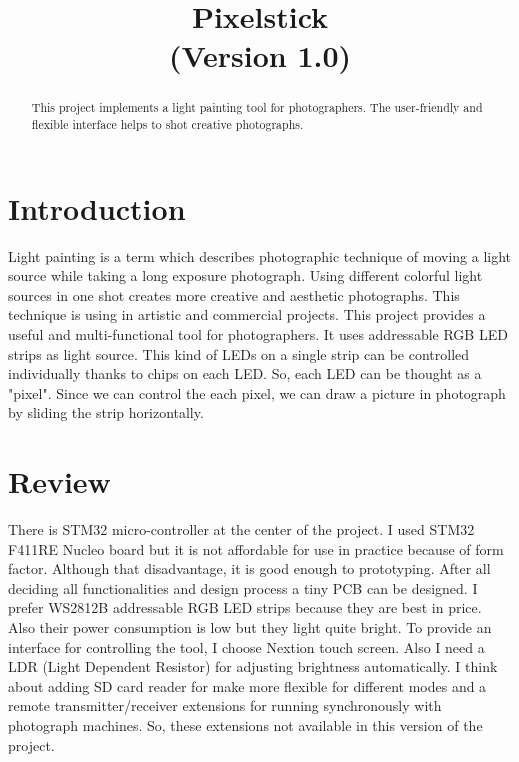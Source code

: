 \documentclass[conference]{IEEEtran}
\begin{document}
\title{Pixelstick\\(Version 1.0)\\
{\footnotesize}
}

\author{
}

\maketitle

\begin{abstract}
This project implements a light painting tool for photographers. The user-friendly and flexible interface helps to shot creative photographs.
\end{abstract}

\section{Introduction}
Light painting is a term which describes photographic technique of moving a light source while taking a long exposure photograph. Using different colorful light sources in one shot creates more creative and aesthetic photographs. This technique is using in artistic and commercial projects. This project provides a useful and multi-functional tool for photographers. It uses addressable RGB LED strips as light source. This kind of LEDs on a single strip can be controlled individually thanks to chips on each LED. So, each LED can be thought as a "pixel". Since we can control the each pixel, we can draw a picture in photograph by sliding the strip horizontally. \\


\section{Review}
There is STM32 micro-controller at the center of the project. I used STM32 F411RE Nucleo board but it is not affordable for use in practice because of form factor. Although that disadvantage, it is good enough to prototyping. After all deciding all functionalities and design process a tiny PCB can be designed. I prefer WS2812B addressable RGB LED strips because they are best in price. Also their power consumption is low but they light quite bright. To provide an interface for controlling the tool, I choose Nextion touch screen. Also I need a LDR (Light Dependent Resistor) for adjusting brightness automatically. I think about adding SD card reader for make more flexible for different modes and a remote transmitter/receiver extensions for running synchronously with photograph machines. So, these extensions not available in this version of the project. \\
\end{document}
